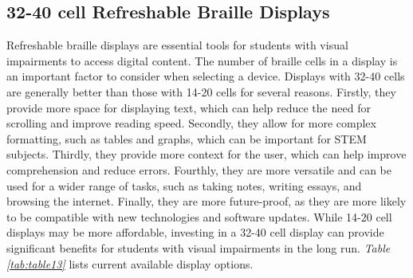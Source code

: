 \pagebreak
\hypertarget{cell-refreshable-braille-displays}{}\subsection{32-40 cell Refreshable Braille
 Displays}\label{cell-refreshable-braille-displays}
Refreshable braille displays are essential tools for students with visual impairments to access digital content. The number of braille cells in a display is an important factor to consider when selecting a device. Displays with 32-40 cells are generally better than those with 14-20 cells for several reasons. Firstly, they provide more space for displaying text, which can help reduce the need for scrolling and improve reading speed. Secondly, they allow for more complex formatting, such as tables and graphs, which can be important for STEM subjects. Thirdly, they provide more context for the user, which can help improve comprehension and reduce errors. Fourthly, they are more versatile and can be used for a wider range of tasks, such as taking notes, writing essays, and browsing the internet. Finally, they are more future-proof, as they are more likely to be compatible with new technologies and software updates. While 14-20 cell displays may be more affordable, investing in a 32-40 cell display can provide significant benefits for students with visual impairments in the long run. \textit{Table \ref{tab:table13}} lists current available display options.

\pagebreak 
 
